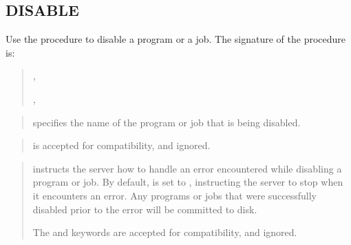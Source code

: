 \documentclass[letterpaper,10pt,english,openany,oneside]{sphinxmanual}
\begin{document}
\subsection{DISABLE}
\label{\detokenize{dbms_scheduler_disable::doc}}\label{\detokenize{dbms_scheduler_disable:disable}}\label{\detokenize{dbms_scheduler_disable:index-0}}
Use the  procedure to disable a program or a job. The signature
of the  procedure is:
\begin{quote}

\begin{DUlineblock}{0em}
\item[] 
\item[] ,
\item[] ,
\item[] 
\end{DUlineblock}
\end{quote}


\begin{quote}

 specifies the name of the program or job that is being
disabled.
\end{quote}

\begin{quote}

 is accepted for compatibility, and ignored.
\end{quote}

\begin{quote}

 instructs the server how to handle an error
encountered while disabling a program or job. By default,
 is set to , instructing
the server to stop when it encounters an error. Any programs or jobs
that were successfully disabled prior to the error will be committed
to disk.

The  and  keywords are accepted for
compatibility, and ignored.
\end{quote}
\end{document}
